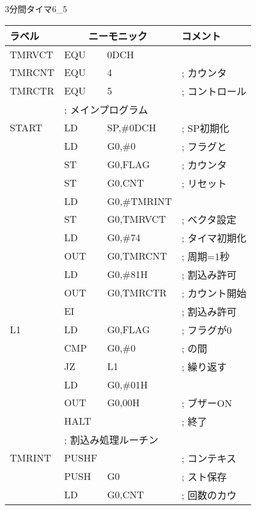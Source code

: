 \begin{figure}[btp]
\begin{reidai}{3分間タイマ}{6_5}
\begin{description}
{\footnotesize\tt\begin{center}
\begin{tabular}{|l|l l l|} \hline
ラベル & \multicolumn{2}{|c}{ニーモニック} & コメント \\
\hline
TMRVCT & EQU    & 0DCH              &                 \\
TMRCNT & EQU    & 4                 & ; カウンタ      \\
TMRCTR & EQU    & 5                 & ; コントロール  \\
       & \multicolumn{3}{|l|}{; メインプログラム}     \\
START  & LD     & SP,\#0DCH         & ; SP初期化      \\
       & LD     & G0,\#0            & ; フラグと      \\
       & ST     & G0,FLAG           & ; カウンタ      \\
       & ST     & G0,CNT            & ; リセット      \\
       & LD     & G0,\#TMRINT       &                 \\
       & ST     & G0,TMRVCT         & ; ベクタ設定    \\
       & LD     & G0,\#74           & ; タイマ初期化  \\
       & OUT    & G0,TMRCNT         & ;   周期=1秒    \\
       & LD     & G0,\#81H          & ;   割込み許可  \\
       & OUT    & G0,TMRCTR	    & ;   カウント開始\\
       & EI     &                   & ; 割込み許可    \\
L1     & LD     & G0,FLAG           & ; フラグが0     \\
       & CMP    & G0,\#0            & ; の間          \\
       & JZ     & L1                & ; 繰り返す      \\
       & LD     & G0,\#01H          &                 \\
       & OUT    & G0,00H            & ; ブザーON      \\
       & HALT   &                   & ; 終了          \\
       & \multicolumn{3}{|l|}{; 割込み処理ルーチン}   \\
TMRINT & PUSHF  &                   & ; コンテキス    \\
       & PUSH   & G0                & ; スト保存      \\
       & LD     & G0,CNT            & ; 回数のカウ    \\

\end{tabular}
\end{center}}
\end{description}
\end{reidai}
\end{figure}
